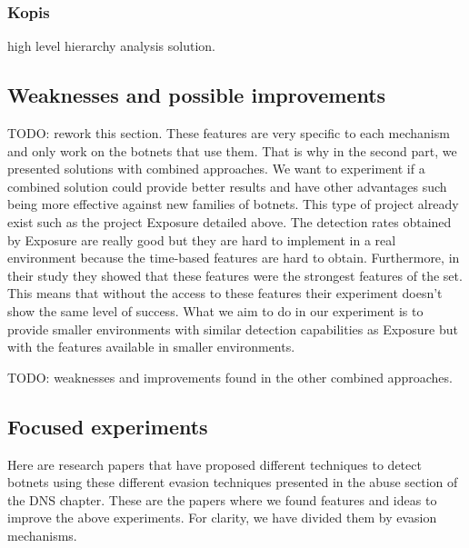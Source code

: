 \subsubsection{Kopis} high level hierarchy analysis solution.

\subsection{Weaknesses and possible improvements}
TODO: rework this section.
These features are very specific to each mechanism and only work on the botnets that use them. That is why in the second part, we presented solutions with combined approaches. We want to experiment if a combined solution could provide better results and have other advantages such being more effective against new families of botnets. 
This type of project already exist such as the project Exposure detailed above. The detection rates obtained by Exposure are really good but they are hard to implement in a real environment because the time-based features are hard to obtain. Furthermore, in their study they showed that these features were the strongest features of the set. This means that without the access to these features their experiment doesn't show the same level of success. What we aim to do in our experiment is to provide smaller environments with similar detection capabilities as Exposure but with the features available in smaller environments. 

TODO: weaknesses and improvements found in the other combined approaches.
\subsection{Focused experiments}
Here are research papers that have proposed different techniques to detect botnets using these different evasion techniques presented in the abuse section of the DNS chapter. These are the papers where we found features and ideas to improve the above experiments. For clarity, we have divided them by evasion mechanisms.
